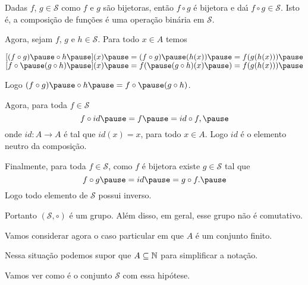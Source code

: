 \documentclass{beamer}
\begin{document}
    \begin{frame}
        Dadas $f$, $g \in \mathcal{S}$ \pause como $f$ e $g$ s\~ao bijetoras, \pause ent\~ao $f \circ g$ \'e bijetora \pause e da{\'\i} $f \circ g \in \mathcal{S}$. \pause Isto \'e, \pause a composi\c{c}\~ao de fun\c{c}\~oes \pause \'e uma opera\c{c}\~ao bin\'aria em $\mathcal{S}$.

        \vspace{.3cm}

        Agora, sejam $f$, $g$ e $h \in \mathcal{S}$. \pause Para todo $x \in A$ temos\pause
        \begin{center}
            $[(f\circ g) \pause \circ h \pause](x) \pause = (f \circ g) \pause(h(x)) \pause = f(g(h(x))) \pause$\\ \vspace{.5cm}
            $[f\circ \pause(g\circ h) \pause](x) \pause = f( \pause(g\circ h)(x) \pause) = f(g(h(x))) \pause$
        \end{center}

        Logo $(f\circ g) \pause \circ h  \pause = f\circ \pause (g\circ h)$. \pause

        \vspace{.3cm}

        Agora, para toda $f \in \mathcal{S}$\pause
        \[
            f\circ id  \pause = f  \pause = id\circ f, \pause
        \]
        onde $id : A \to A$ \pause \'e tal que $id(x) = x$, \pause para todo $x \in A$. \pause Logo $id$ \'e o elemento neutro da composi\c{c}\~ao.\pause

    \end{frame}

    \begin{frame}

        Finalmente, \pause para toda $f \in \mathcal{S}$, \pause como $f$ \'e bijetora \pause existe $g \in \mathcal{S}$ \pause tal que \pause
        \[
            f\circ g \pause = id \pause = g \circ f. \pause
        \]
        Logo todo elemento de $\mathcal{S}$ \pause possui inverso. \pause

        \vspace{.3cm}

        Portanto $(\mathcal{S}, \circ)$ \pause \'e um grupo.  \pause Al\'em disso, em geral, esse grupo n\~ao \'e comutativo. \pause

        \vspace{.3cm}

        Vamos considerar agora o caso particular \pause em que $A$ \'e um conjunto finito. \pause

        \vspace{.3cm}

        Nessa situa\c{c}\~ao podemos supor que $A \subseteq \mathbb{N}$ \pause para simplificar a nota\c{c}\~ao. \pause

        \vspace{.3cm}

        Vamos ver como \'e o conjunto $\mathcal{S}$ com essa hip\'otese. \pause
    \end{frame}
\end{document}
